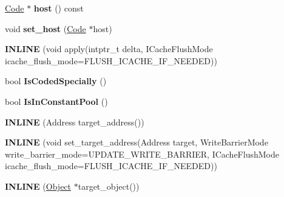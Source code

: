 \begin{DoxyCompactItemize}
\item 
\hypertarget{classv8_1_1internal_1_1_reloc_info_aebdb6182117b663964fec7b2ac117c61}{}\hyperlink{classv8_1_1internal_1_1_code}{Code} $\ast$ {\bfseries host} () const \label{classv8_1_1internal_1_1_reloc_info_aebdb6182117b663964fec7b2ac117c61}

\item 
\hypertarget{classv8_1_1internal_1_1_reloc_info_af75c22e2b412d6c9cf663a65c928ea52}{}void {\bfseries set\+\_\+host} (\hyperlink{classv8_1_1internal_1_1_code}{Code} $\ast$host)\label{classv8_1_1internal_1_1_reloc_info_af75c22e2b412d6c9cf663a65c928ea52}

\item 
\hypertarget{classv8_1_1internal_1_1_reloc_info_ae1b679e8a450e827d5c33b2759418156}{}{\bfseries I\+N\+L\+I\+N\+E} (void apply(intptr\+\_\+t delta, I\+Cache\+Flush\+Mode icache\+\_\+flush\+\_\+mode=F\+L\+U\+S\+H\+\_\+\+I\+C\+A\+C\+H\+E\+\_\+\+I\+F\+\_\+\+N\+E\+E\+D\+E\+D))\label{classv8_1_1internal_1_1_reloc_info_ae1b679e8a450e827d5c33b2759418156}

\item 
\hypertarget{classv8_1_1internal_1_1_reloc_info_a8f33d5c22a0e3cbe30e5ff67843dea3f}{}bool {\bfseries Is\+Coded\+Specially} ()\label{classv8_1_1internal_1_1_reloc_info_a8f33d5c22a0e3cbe30e5ff67843dea3f}

\item 
\hypertarget{classv8_1_1internal_1_1_reloc_info_a74178a98b5efdd971a4f647281b6296e}{}bool {\bfseries Is\+In\+Constant\+Pool} ()\label{classv8_1_1internal_1_1_reloc_info_a74178a98b5efdd971a4f647281b6296e}

\item 
\hypertarget{classv8_1_1internal_1_1_reloc_info_a3ddf4a07c8ce0a7859c1591c5a1de96f}{}{\bfseries I\+N\+L\+I\+N\+E} (Address target\+\_\+address())\label{classv8_1_1internal_1_1_reloc_info_a3ddf4a07c8ce0a7859c1591c5a1de96f}

\item 
\hypertarget{classv8_1_1internal_1_1_reloc_info_a0494dff2013fdf78b0fe4465775aec99}{}{\bfseries I\+N\+L\+I\+N\+E} (void set\+\_\+target\+\_\+address(Address target, Write\+Barrier\+Mode write\+\_\+barrier\+\_\+mode=U\+P\+D\+A\+T\+E\+\_\+\+W\+R\+I\+T\+E\+\_\+\+B\+A\+R\+R\+I\+E\+R, I\+Cache\+Flush\+Mode icache\+\_\+flush\+\_\+mode=F\+L\+U\+S\+H\+\_\+\+I\+C\+A\+C\+H\+E\+\_\+\+I\+F\+\_\+\+N\+E\+E\+D\+E\+D))\label{classv8_1_1internal_1_1_reloc_info_a0494dff2013fdf78b0fe4465775aec99}

\item 
\hypertarget{classv8_1_1internal_1_1_reloc_info_a30056a5abdddadd54ad5f17c7f036a2b}{}{\bfseries I\+N\+L\+I\+N\+E} (\hyperlink{classv8_1_1internal_1_1_object}{Object} $\ast$target\+\_\+object())\label{classv8_1_1internal_1_1_reloc_info_a30056a5abdddadd54ad5f17c7f036a2b}


\end{DoxyCompactItemize}
